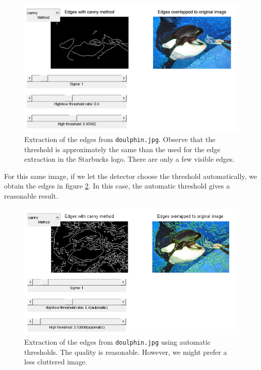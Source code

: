 \begin{figure}[!hbt]
  \includegraphics[width=\textwidth]{./img/ex1/canny_doulphin_045.png}
  \caption[Extraction of the edges from \texttt{doulphin.jpg}]
	{Extraction of the edges from \texttt{doulphin.jpg}.
	Observe that the threshold is approximately the same than the used for the edge extraction in
	the Starbucks logo. There are only a few visible edges.}
  \label{fig:cannydoulphinsamethreshold}
\end{figure}

For this same image, if we let the detector choose the threshold automatically,
we obtain the edges in figure \ref{fig:cannydoulphinautomatic}. In this case,
the automatic threshold gives a reasonable result.

\begin{figure}[!hbt]
  \includegraphics[width=\textwidth]{./img/ex1/canny_doulphin_auto.png}
  \caption[Extraction of the edges from \texttt{doulphin.jpg} using automatic thresholds]
	{Extraction of the edges from \texttt{doulphin.jpg} using automatic thresholds.
	The quality is reasonable. However, we might prefer a less cluttered image.}
  \label{fig:cannydoulphinautomatic}
\end{figure}

